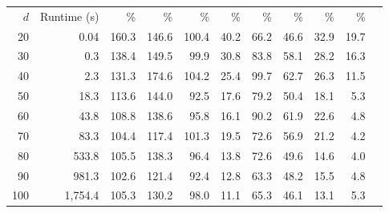\begin{table}
\begin{center}
{{\begin{tabular}{rrrrrrrrrrr}
\noalign{\smallskip} 
$d$ & Runtime (s) & \% & \% & \% & \% & \% & \% & \% & \% & \\
\cline{1-10} \noalign{\smallskip} 
20 & 0.04 & 160.3 & 146.6 & 100.4 & 40.2 & 66.2 & 46.6 & 32.9 & 19.7 \\ 
30 & 0.3 & 138.4 & 149.5 & 99.9 & 30.8 & 83.8 & 58.1 & 28.2 & 16.3 \\ 
40 & 2.3 & 131.3 & 174.6 & 104.2 & 25.4 & 99.7 & 62.7 & 26.3 & 11.5 \\ 
50 & 18.3 & 113.6 & 144.0 & 92.5 & 17.6 & 79.2 & 50.4 & 18.1 & 5.3 \\ 
60 & 43.8 & 108.8 & 138.6 & 95.8 & 16.1 & 90.2 & 61.9 & 22.6 & 4.8 \\  
70 & 83.3 & 104.4 & 117.4 & 101.3 & 19.5 & 72.6 & 56.9 & 21.2 & 4.2 \\
80 & 533.8 & 105.5 & 138.3 & 96.4 & 13.8 & 72.6 & 49.6 & 14.6 & 4.0 \\ 
90 & 981.3 & 102.6 & 121.4 & 92.4 & 12.8 & 63.3 & 48.2 & 15.5 & 4.8 \\ 
100 & 1,754.4 & 105.3 & 130.2 & 98.0 & 11.1 & 65.3 & 46.1 & 13.1 & 5.3 \\ 
\hline
\end{tabular}
}
        }\\ %
\end{center}
\label{tab:6-5}
\end{table}

